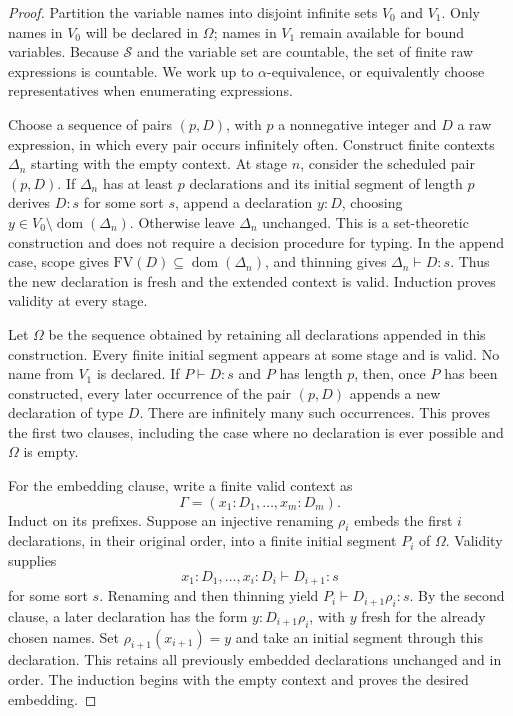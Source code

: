 \begin{proof}
Partition the variable names into disjoint infinite sets $V_0$ and
$V_1$.  Only names in $V_0$ will be declared in $\Omega$; names in
$V_1$ remain available for bound variables.  Because $\mathcal S$ and
the variable set are countable, the set of finite raw expressions is
countable.  We work up to $\alpha$-equivalence, or equivalently choose
representatives when enumerating expressions.

Choose a sequence of pairs $(p,D)$, with $p$ a nonnegative integer and
$D$ a raw expression, in which every pair occurs infinitely often.
Construct finite contexts $\Delta_n$ starting with the empty context.
At stage $n$, consider the scheduled pair $(p,D)$.  If $\Delta_n$ has
at least $p$ declarations and its initial segment of length $p$ derives
$D:s$ for some sort $s$, append a declaration $y:D$, choosing
$y\in V_0\setminus\operatorname{dom}(\Delta_n)$.  Otherwise leave
$\Delta_n$ unchanged.  This is a set-theoretic construction and does
not require a decision procedure for typing.  In the append case,
scope gives $\mathrm{FV}(D)\subseteq
\operatorname{dom}(\Delta_n)$, and thinning gives
$\Delta_n\vdash D:s$.  Thus the new declaration is fresh and the
extended context is valid.  Induction proves validity at every stage.

Let $\Omega$ be the sequence obtained by retaining all declarations
appended in this construction.  Every finite initial segment appears
at some stage and is valid.  No name from $V_1$ is declared.  If
$P\vdash D:s$ and $P$ has length $p$, then, once $P$ has been
constructed, every later occurrence of the pair $(p,D)$ appends a new
declaration of type $D$.  There are infinitely many such occurrences.
This proves the first two clauses, including the case where no
declaration is ever possible and $\Omega$ is empty.

For the embedding clause, write a finite valid context as
\[
  \Gamma=(x_1:D_1,\ldots,x_m:D_m).
\]
Induct on its prefixes.  Suppose an injective renaming $\rho_i$ embeds
the first $i$ declarations, in their original order, into a finite
initial segment $P_i$ of $\Omega$.  Validity supplies
\[
  x_1:D_1,\ldots,x_i:D_i\vdash D_{i+1}:s
\]
for some sort $s$.  Renaming and then thinning yield
$P_i\vdash D_{i+1}\rho_i:s$.  By the second clause, a later
declaration has the form $y:D_{i+1}\rho_i$, with $y$ fresh for the
already chosen names.  Set $\rho_{i+1}(x_{i+1})=y$ and take an initial
segment through this declaration.  This retains all previously
embedded declarations unchanged and in order.  The induction begins
with the empty context and proves the desired embedding.


\end{proof}
